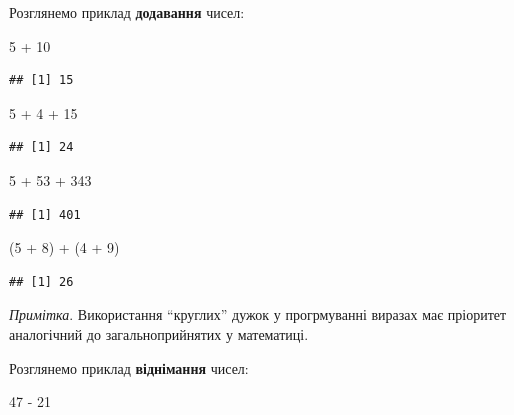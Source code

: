 \documentclass[
]{book}
\newenvironment{Shaded}{\begin{snugshade}}{\end{snugshade}}
\newcommand{\DecValTok}[1]{\textcolor[rgb]{0.00,0.00,0.81}{#1}}
\newcommand{\NormalTok}[1]{#1}
\newcommand{\SpecialCharTok}[1]{\textcolor[rgb]{0.00,0.00,0.00}{#1}}
\begin{document}
Розглянемо приклад \textbf{додавання} чисел:

\begin{Shaded}
\begin{Highlighting}[]
\DecValTok{5} \SpecialCharTok{+} \DecValTok{10}
\end{Highlighting}
\end{Shaded}

\begin{verbatim}
## [1] 15
\end{verbatim}

\begin{Shaded}
\begin{Highlighting}[]
\DecValTok{5} \SpecialCharTok{+} \DecValTok{4} \SpecialCharTok{+} \DecValTok{15}
\end{Highlighting}
\end{Shaded}

\begin{verbatim}
## [1] 24
\end{verbatim}

\begin{Shaded}
\begin{Highlighting}[]
\DecValTok{5} \SpecialCharTok{+} \DecValTok{53} \SpecialCharTok{+} \DecValTok{343}
\end{Highlighting}
\end{Shaded}

\begin{verbatim}
## [1] 401
\end{verbatim}

\begin{Shaded}
\begin{Highlighting}[]
\NormalTok{(}\DecValTok{5} \SpecialCharTok{+} \DecValTok{8}\NormalTok{) }\SpecialCharTok{+}\NormalTok{ (}\DecValTok{4} \SpecialCharTok{+} \DecValTok{9}\NormalTok{)}
\end{Highlighting}
\end{Shaded}

\begin{verbatim}
## [1] 26
\end{verbatim}

\emph{Примітка}. Використання ``круглих'' дужок у прогрмуванні виразах має пріоритет аналогічний до загальноприйнятих у математиці.

Розглянемо приклад \textbf{віднімання} чисел:

\begin{Shaded}
\begin{Highlighting}[]
\DecValTok{47} \SpecialCharTok{{-}} \DecValTok{21}
\end{Highlighting}
\end{Shaded}
\end{document}
